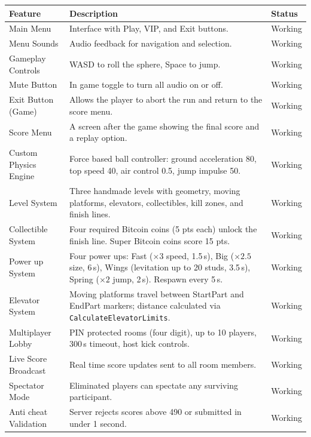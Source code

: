 \documentclass[12pt,letterpaper]{article}
\begin{document}
\begin{table}[H]
\centering
\begin{tabular}{|p{4cm}|p{8cm}|p{2.5cm}|}
\hline
\textbf{Feature} & \textbf{Description} & \textbf{Status} \\
\hline
Main Menu & Interface with Play, VIP, and Exit buttons. & Working \\
\hline
Menu Sounds & Audio feedback for navigation and selection. & Working \\
\hline
Gameplay Controls & WASD to roll the sphere, Space to jump. & Working \\
\hline
Mute Button & In game toggle to turn all audio on or off. & Working \\
\hline
Exit Button (Game) & Allows the player to abort the run and return to the score menu. & Working \\
\hline
Score Menu & A screen after the game showing the final score and a replay option. & Working \\
\hline
Custom Physics Engine & Force based ball controller: ground acceleration 80, top speed 40, air control 0.5, jump impulse 50. & Working \\
\hline
Level System & Three handmade levels with geometry, moving platforms, elevators, collectibles, kill zones, and finish lines. & Working \\
\hline
Collectible System & Four required Bitcoin coins (5 pts each) unlock the finish line. Super Bitcoin coins score 15 pts. & Working \\
\hline
Power up System & Four power ups: Fast ($\times 3$ speed, 1.5\,s), Big ($\times 2.5$ size, 6\,s), Wings (levitation up to 20 studs, 3.5\,s), Spring ($\times 2$ jump, 2\,s). Respawn every 5\,s. & Working \\
\hline
Elevator System & Moving platforms travel between StartPart and EndPart markers; distance calculated via \texttt{CalculateElevatorLimits}. & Working \\
\hline
Multiplayer Lobby & PIN protected rooms (four digit), up to 10 players, 300\,s timeout, host kick controls. & Working \\
\hline
Live Score Broadcast & Real time score updates sent to all room members. & Working \\
\hline
Spectator Mode & Eliminated players can spectate any surviving participant. & Working \\
\hline
Anti cheat Validation & Server rejects scores above 490 or submitted in under 1 second. & Working \\

\end{tabular}
\end{table}
\end{document}
